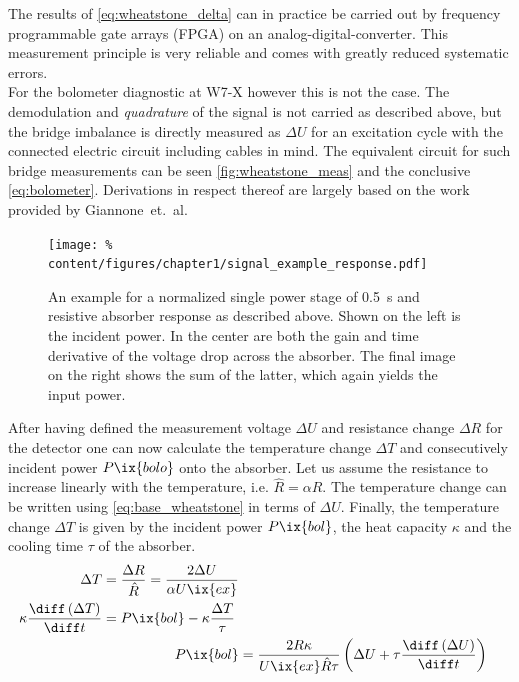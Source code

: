 %
                The results of \cref{eq:wheatstone_delta} can in practice be carried out by frequency programmable gate arrays (FPGA) on an analog-digital-converter. This measurement principle is very reliable and comes with greatly reduced systematic errors\cite{Mast1991,Lovell2017}.\\%
                For the bolometer diagnostic at W7-X however this is not the case. The demodulation and \textit{quadrature} of the signal is not carried as described above, but the bridge imbalance is directly measured as $\Delta U$ for an excitation cycle with the connected electric circuit including cables in mind. The equivalent circuit for such bridge measurements can be seen \cref{fig:wheatstone_meas} and the conclusive \cref{eq:bolometer}. Derivations in respect thereof are largely based on the work provided by Giannone~et.~al\cite{Giannone2002}.\\%
%
                    \begin{figure}%
                        \centering%
                        \texttt{[image: \%
                            content/figures/chapter1/signal\_example\_response.pdf]}%
                        \caption{An example for a normalized single power stage of \SI{0.5}{\second} and resistive absorber response as described above. Shown on the left is the incident power. In the center are both the gain and time derivative of the voltage drop across the absorber. The final image on the right shows the sum of the latter, which again yields the input power.}\label{fig:signal_example}%
                    \end{figure}%
%
                After having defined the measurement voltage $\Delta U$ and resistance change $\Delta R$ for the detector one can now calculate the temperature change $\Delta T$ and consecutively incident power $P\ix{bolo}$ onto the absorber. Let us assume the resistance to increase linearly with the temperature, i.e. $\hat{R}=\alpha R$. The temperature change can be written using \cref{eq:base_wheatstone} in terms of $\Delta U$. Finally, the temperature change $\Delta T$ is given by the incident power $P\ix{bol}$, the heat capacity $\kappa$ and the cooling time $\tau$ of the absorber.%
%
                \begin{align}%
                    \begin{split}\label{eq:resistance_power}%
                        \Delta T&=\frac{\Delta R}{\hat{R}}=\frac{2\Delta U}{\alpha U\ix{ex}}\\%
                        \kappa\frac{\diff\left(\Delta T\right)}{\diff t}&=P\ix{bol}-\kappa\frac{\Delta T}{\tau}%
                    \end{split}\\%
                    P\ix{bol}&=\frac{2R\kappa}{U\ix{ex}\hat{R}\tau}\left(\Delta U+\tau\frac{\diff\left(\Delta U\right)}{\diff t}\right)\label{eq:bolopower}
                \end{align}%
